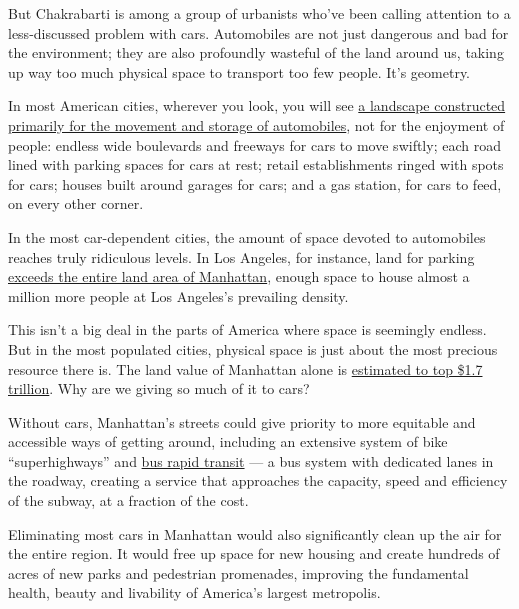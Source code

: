 But Chakrabarti is among a group of urbanists who've been calling
attention to a less-discussed problem with cars. Automobiles are not
just dangerous and bad for the environment; they are also profoundly
wasteful of the land around us, taking up way too much physical space to
transport too few people. It's geometry.

In most American cities, wherever you look, you will see
\href{https://oldurbanist.blogspot.com/2011/12/we-are-25-looking-at-street-area.html}{a
landscape constructed primarily for the movement and storage of
automobiles}, not for the enjoyment of people: endless wide boulevards
and freeways for cars to move swiftly; each road lined with parking
spaces for cars at rest; retail establishments ringed with spots for
cars; houses built around garages for cars; and a gas station, for cars
to feed, on every other corner.

In the most car-dependent cities, the amount of space devoted to
automobiles reaches truly ridiculous levels. In Los Angeles, for
instance, land for parking
\href{https://la.curbed.com/2018/11/30/18119646/los-angeles-parking-lots-total-size-development}{exceeds
the entire land area of Manhattan}, enough space to house almost a
million more people at Los Angeles's prevailing density.

This isn't a big deal in the parts of America where space is seemingly
endless. But in the most populated cities, physical space is just about
the most precious resource there is. The land value of Manhattan alone
is
\href{https://www.bloomberg.com/news/articles/2018-04-24/manhattan-s-land-value-is-an-incredible-1-74-trillion}{estimated
to top \$1.7 trillion}. Why are we giving so much of it to cars?

Without cars, Manhattan's streets could give priority to more equitable
and accessible ways of getting around, including an extensive system of
bike ``superhighways'' and
\href{https://www.itdp.org/library/standards-and-guides/the-bus-rapid-transit-standard/what-is-brt/}{bus
rapid transit} --- a bus system with dedicated lanes in the roadway,
creating a service that approaches the capacity, speed and efficiency of
the subway, at a fraction of the cost.

Eliminating most cars in Manhattan would also significantly clean up the
air for the entire region. It would free up space for new housing and
create hundreds of acres of new parks and pedestrian promenades,
improving the fundamental health, beauty and livability of America's
largest metropolis.

